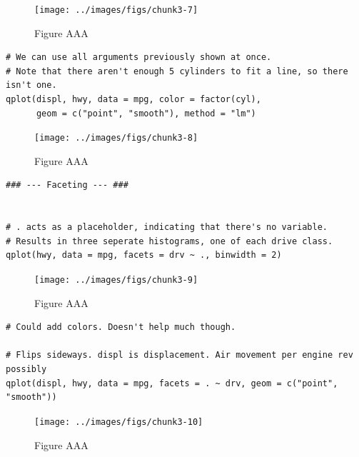 \begin{figure}[H]

{\centering \texttt{[image: ../images/figs/chunk3-7]} 

}

\caption{Figure AAA}\label{fig:chunk3-7}
\end{figure}

\begin{verbatim}
# We can use all arguments previously shown at once.
# Note that there aren't enough 5 cylinders to fit a line, so there isn't one.
qplot(displ, hwy, data = mpg, color = factor(cyl),
      geom = c("point", "smooth"), method = "lm")
\end{verbatim}

\begin{figure}[H]

{\centering \texttt{[image: ../images/figs/chunk3-8]} 

}

\caption{Figure AAA}\label{fig:chunk3-8}
\end{figure}

\begin{verbatim}
### --- Faceting --- ###


# . acts as a placeholder, indicating that there's no variable.
# Results in three seperate histograms, one of each drive class.
qplot(hwy, data = mpg, facets = drv ~ ., binwidth = 2)
\end{verbatim}

\begin{figure}[H]

{\centering \texttt{[image: ../images/figs/chunk3-9]} 

}

\caption{Figure AAA}\label{fig:chunk3-9}
\end{figure}

\begin{verbatim}
# Could add colors. Doesn't help much though.

# Flips sideways. displ is displacement. Air movement per engine rev possibly
qplot(displ, hwy, data = mpg, facets = . ~ drv, geom = c("point", "smooth"))
\end{verbatim}

\begin{figure}[H]

{\centering \texttt{[image: ../images/figs/chunk3-10]} 

}

\caption{Figure AAA}\label{fig:chunk3-10}
\end{figure}

